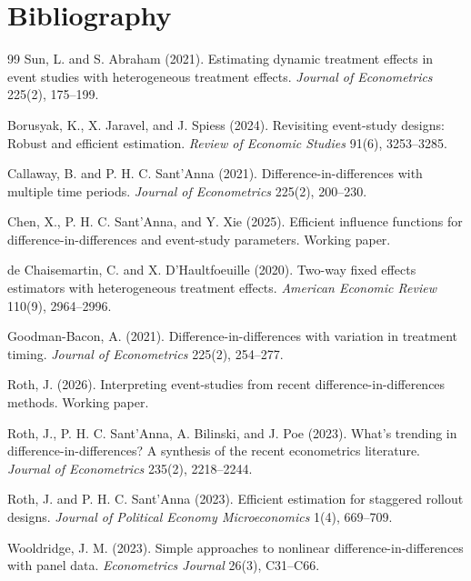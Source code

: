 \documentclass[11pt]{article}
\theoremstyle{definition}
\theoremstyle{plain}
\theoremstyle{remark}
\begin{document}
\section*{Bibliography}
\begin{thebibliography}{99}
Sun, L. and S. Abraham (2021).
Estimating dynamic treatment effects in event studies with heterogeneous
treatment effects.
\emph{Journal of Econometrics} 225(2), 175--199.

Borusyak, K., X. Jaravel, and J. Spiess (2024).
Revisiting event-study designs: Robust and efficient estimation.
\emph{Review of Economic Studies} 91(6), 3253--3285.

Callaway, B. and P. H. C. Sant'Anna (2021).
Difference-in-differences with multiple time periods.
\emph{Journal of Econometrics} 225(2), 200--230.

Chen, X., P. H. C. Sant'Anna, and Y. Xie (2025).
Efficient influence functions for difference-in-differences and event-study
parameters.
Working paper.

de Chaisemartin, C. and X. D'Haultfoeuille (2020).
Two-way fixed effects estimators with heterogeneous treatment effects.
\emph{American Economic Review} 110(9), 2964--2996.

Goodman-Bacon, A. (2021).
Difference-in-differences with variation in treatment timing.
\emph{Journal of Econometrics} 225(2), 254--277.

Roth, J. (2026).
Interpreting event-studies from recent difference-in-differences methods.
Working paper.

Roth, J., P. H. C. Sant'Anna, A. Bilinski, and J. Poe (2023).
What's trending in difference-in-differences? A synthesis of the recent
econometrics literature.
\emph{Journal of Econometrics} 235(2), 2218--2244.

Roth, J. and P. H. C. Sant'Anna (2023).
Efficient estimation for staggered rollout designs.
\emph{Journal of Political Economy Microeconomics} 1(4), 669--709.

Wooldridge, J. M. (2023).
Simple approaches to nonlinear difference-in-differences with panel data.
\emph{Econometrics Journal} 26(3), C31--C66.
\end{thebibliography}
\end{document}
